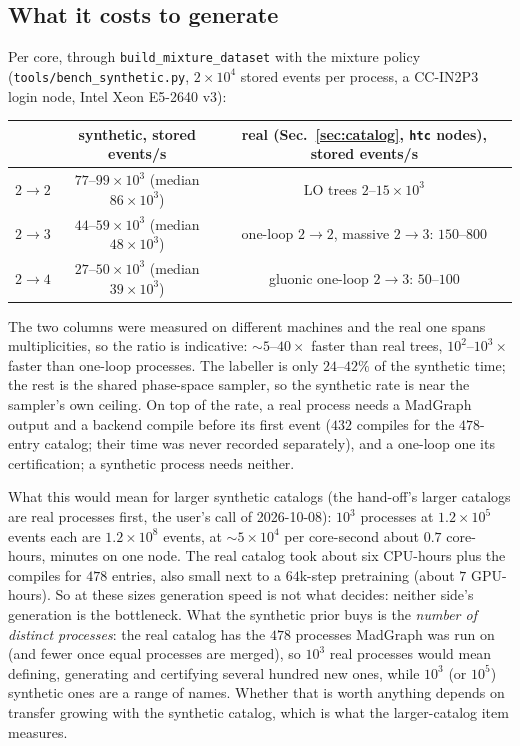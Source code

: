 \documentclass[11pt]{article}
\newcommand{\code}[1]{\texttt{#1}}
\begin{document}
\subsection{What it costs to generate}\label{sec:syn-cost}
Per core, through \code{build\_mixture\_dataset} with the mixture policy (\code{tools/bench\_synthetic.py},
$2\times10^4$ stored events per process, a CC-IN2P3 login node, Intel Xeon E5-2640 v3):
\begin{center}
\begin{tabular}{lcc}
\hline
 & synthetic, stored events/s & real (Sec.~\ref{sec:catalog}, \code{htc} nodes), stored events/s \\
\hline
$2\to2$ & $77$--$99\times10^3$ (median $86\times10^3$) & LO trees $2$--$15\times10^3$ \\
$2\to3$ & $44$--$59\times10^3$ (median $48\times10^3$) & one-loop $2\to2$, massive $2\to3$: $150$--$800$ \\
$2\to4$ & $27$--$50\times10^3$ (median $39\times10^3$) & gluonic one-loop $2\to3$: $50$--$100$ \\
\hline
\end{tabular}
\end{center}
The two columns were measured on different machines and the real one spans multiplicities, so the ratio is indicative:
$\sim5$--$40\times$ faster than real trees, $10^2$--$10^3\times$ faster than one-loop processes. The labeller is only
$24$--$42\%$ of the synthetic time; the rest is the shared phase-space sampler, so the synthetic rate is near the
sampler's own ceiling. On top of the rate, a real process needs a MadGraph output and a backend compile before its
first event ($432$ compiles for the $478$-entry catalog; their time was never recorded separately), and a one-loop one
its certification; a synthetic process needs neither.

What this would mean for larger synthetic catalogs (the hand-off's larger catalogs are real processes first, the user's
call of 2026-10-08): $10^3$ processes at $1.2\times10^5$ events each are $1.2\times10^8$ events, at $\sim5\times10^4$ per core-second about
$0.7$ core-hours, minutes on one node. The real catalog took about six CPU-hours plus the compiles for $478$ entries,
also small next to a $64$k-step pretraining (about $7$ GPU-hours). So at these sizes generation speed is not what
decides: neither side's generation is the bottleneck. What the synthetic prior buys is the \emph{number of distinct
processes}: the real catalog has the $478$ processes MadGraph was run on (and fewer once equal processes are merged),
so $10^3$ real processes would mean defining, generating and certifying several hundred new ones, while $10^3$ (or
$10^5$) synthetic ones are a range of names. Whether that is worth anything depends on transfer growing with the
synthetic catalog, which is what the larger-catalog item measures.
\end{document}
